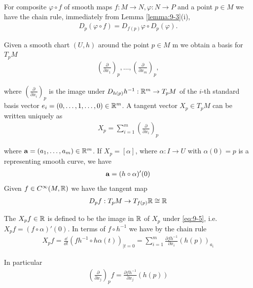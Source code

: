 For composite $\varphi\circ f$ of smooth maps $f:M\to N, \varphi:N\to P$ and a point $p\in M$ we have 
the chain rule, immediately from Lemma \ref{lemma:9-3}(i),
\begin{align}\label{eq:9-3}
  D_p(\varphi\circ f) = D_{f(p)}\varphi\circ D_p(\varphi).
\end{align}

\begin{remark}\label{remark:9-4}
  Given a smooth chart $(U, h)$ around the point $p\in M$ m we obtain
a basis for $T_pM$
\begin{align*}
  \left(\frac{\partial }{\partial x_1}\right)_p, \ldots,
  \left(\frac{\partial }{\partial x_m}\right)_p,
\end{align*}

where $(\frac{\partial }{\partial x_i})_p$ is the image under $D_{h(p)}h^{-1}:{\mathbb{R}}^m\to T_pM$ of the 
$i$-th standard basis vector $e_i = (0, \ldots, 1, \ldots, 0)\in{\ensuremath{\mathbb{R}}}^m$. A tangent vector $X_p\in T_pM$
can be written uniquely as 
\begin{align}\label{eq:9-4}
  X_p = \sum_{i=1}^{m }{\left(\frac{\partial }{\partial x_i }\right)_p}
\end{align}

where $\mathbf{a}=(a_1, \ldots, a_m)\in{\ensuremath{\mathbb{R}}}^m$. If $X_p = [\alpha]$, where $\alpha:I\to U$ with $\alpha(0)=p$ is 
a representing smooth curve, we have 
\begin{align*}
  \mathbf{a} = (h\circ \alpha)'(0)
\end{align*}
Given $f\in C^\infty(M, {\mathbb{R}})$ we have the tangent map 
\begin{align}\label{eq:9-5}
  D_pf:T_pM\to T_{f(p)}{\mathbb{R}}\cong {\ensuremath{\mathbb{R}}}
\end{align}

The  $X_pf\in{\ensuremath{\mathbb{R}}}$ is defined to be the image in ${\mathbb{R}}$ of $X_p$ under
\eqref{eq:9-5}, i.e. $X_pf = (f\circ \alpha)'(0)$. In terms of $f\circ h^{-1}$ we have by the 
chain rule
\begin{align*}
  X_pf = \frac{\dd }{\dd t}\left(fh^{-1}\circ h\alpha(t)\right)_{|t=0}
    = \sum_{i=1}^{m }{\frac{\partial fh^{-1}}{\partial x_i} (h(p))_{a_i}}
\end{align*}

In particular
\begin{align}\label{eq:9-6}
  \left(\frac{\partial }{\partial x_j}\right)_p f 
  = \frac{\partial fh^{-1}}{\partial x_j}(h(p))
\end{align}


\end{remark}
